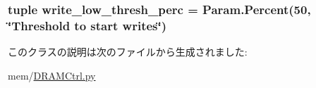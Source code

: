 \label{classDRAMCtrl_1_1DRAMCtrl_a085a7db2cf6b40fb8b91f5a312776d99}
\hypertarget{classDRAMCtrl_1_1DRAMCtrl_a214c964ae36e59109324212f7136d419}{
\subsubsection[{write\_\-low\_\-thresh\_\-perc}]{\setlength{\rightskip}{0pt plus 5cm}tuple {\bf write\_\-low\_\-thresh\_\-perc} = Param.Percent(50, \char`\"{}Threshold to start writes\char`\"{})}}
\label{classDRAMCtrl_1_1DRAMCtrl_a214c964ae36e59109324212f7136d419}


このクラスの説明は次のファイルから生成されました:\begin{DoxyCompactItemize}
\item 
mem/\hyperlink{DRAMCtrl_8py}{DRAMCtrl.py}\end{DoxyCompactItemize}
